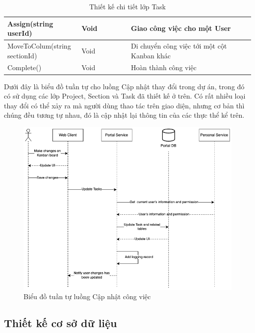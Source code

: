 \documentclass[../DoAn.tex]{subfiles}
\begin{document}
\begin{table}[H]
\begin{tabular}{p{0.3\linewidth}p{0.2\linewidth}p{0.5\linewidth}}
        Assign(string userId)         & Void                  & Giao công việc cho một User                     \\ \hline
        MoveToColum(string sectionId) & Void                  & Di chuyển công việc tới một cột Kanban khác     \\ \hline
        Complete()                    & Void                  & Hoàn thành công việc                            \\ \hline
    \end{tabular}
    \renewcommand{\arraystretch}{1}
    \caption{Thiết kế chi tiết lớp Task}
    \label{fig:classdesign_task}
\end{table}

\newpage

Dưới đây là biểu đồ tuần tự cho luồng Cập nhật thay đổi trong dự án, trong đó có sử dụng các lớp Project, Section và Task đã thiết kế ở trên.
Có rất nhiều loại thay đổi có thể xảy ra mà người dùng thao tác trên giao diện, nhưng cơ bản thì chúng đều tương tự nhau, đó là cập nhật lại thông tin
của các thực thể kể trên.


\begin{figure}[H]
    \centering
    \includegraphics[width=1.0\linewidth]{Hinhve/SequenceDiagram_UpdateTask.png}
    \caption{Biểu đồ tuần tự luồng Cập nhật công việc}
    \label{fig:SequenceDiagram_Register}
\end{figure}

\newpage

\subsection{Thiết kế cơ sở dữ liệu}
\label{subsection:4.2.3}
\end{document}
